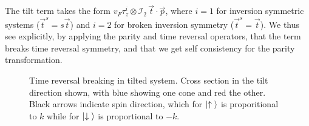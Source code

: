 The tilt term takes the form \(v_F \tau_z^i \otimes \mathcal{I}_{2} \, \vec{t} \cdot \vec{p} \), where \( i=1 \) for inversion symmetric systems (\( \vec{t}^s = s \vec{t} \)) and \( i=2 \) for broken inversion symmetry (\( \vec{t}^s = \vec{t} \)).
We thus see explicitly, by applying the parity and time reversal operators, that the term breaks time reversal symmetry, and that we get self consistency for the parity transformation.

\begin{figure}[h]
  \centering
  \caption{Time reversal breaking in tilted system.
    Cross section in the tilt direction shown, with blue showing one cone and red the other.
    Black arrows indicate spin direction, which for \(\ket{\uparrow {}}\) is proporitional to  \(k\) while for \(\ket{\downarrow {}}\) is proportional to \( -k \).
  }
\end{figure}

